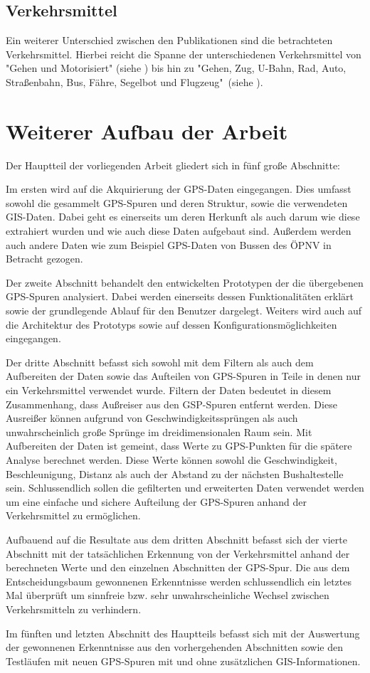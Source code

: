 \subsection{Verkehrsmittel}
Ein weiterer Unterschied zwischen den Publikationen sind die betrachteten Verkehrsmittel. Hierbei reicht die Spanne der unterschiedenen Verkehrsmittel von "Gehen und Motorisiert" (siehe \cite{reddy_using_2010}) bis hin zu "Gehen, Zug, U-Bahn, Rad, Auto, Straßenbahn, Bus, Fähre, Segelbot und Flugzeug"\ (siehe \cite{biljecki_transportation_2013}).

\section{Weiterer Aufbau der Arbeit}
Der Hauptteil der vorliegenden Arbeit gliedert sich in fünf große Abschnitte:

Im ersten wird auf die Akquirierung der GPS-Daten eingegangen. Dies umfasst sowohl die gesammelt GPS-Spuren und deren Struktur, sowie die verwendeten GIS-Daten. Dabei geht es einerseits um deren Herkunft als auch darum wie diese extrahiert wurden und wie auch diese Daten aufgebaut sind. Außerdem werden auch andere Daten wie zum Beispiel GPS-Daten von Bussen des ÖPNV in Betracht gezogen.

Der zweite Abschnitt behandelt den entwickelten Prototypen der die übergebenen GPS-Spuren analysiert. Dabei werden einerseits dessen Funktionalitäten erklärt sowie der grundlegende Ablauf für den Benutzer dargelegt. Weiters wird auch auf die Architektur des Prototyps sowie auf dessen Konfigurationsmöglichkeiten eingegangen.

Der dritte Abschnitt befasst sich sowohl mit dem Filtern als auch dem Aufbereiten der Daten sowie das Aufteilen von GPS-Spuren in Teile in denen nur ein Verkehrsmittel verwendet wurde. Filtern der Daten bedeutet in diesem Zusammenhang, dass Außreiser aus den GSP-Spuren entfernt werden. Diese Ausreißer können aufgrund von Geschwindigkeitssprüngen als auch unwahrscheinlich große Sprünge im dreidimensionalen Raum sein. Mit Aufbereiten der Daten ist gemeint, dass Werte zu GPS-Punkten für die spätere Analyse berechnet werden. Diese Werte können sowohl die Geschwindigkeit, Beschleunigung, Distanz als auch der Abstand zu der nächsten Bushaltestelle sein. Schlussendlich sollen die gefilterten und erweiterten Daten verwendet werden um eine einfache und sichere Aufteilung der GPS-Spuren anhand der Verkehrsmittel zu ermöglichen.

Aufbauend auf die Resultate aus dem dritten Abschnitt befasst sich der vierte Abschnitt mit der tatsächlichen Erkennung von der Verkehrsmittel anhand der berechneten Werte und den einzelnen Abschnitten der GPS-Spur. Die aus dem Entscheidungsbaum gewonnenen Erkenntnisse werden schlussendlich ein letztes Mal überprüft um sinnfreie bzw. sehr unwahrscheinliche Wechsel zwischen Verkehrsmitteln zu verhindern.

Im fünften und letzten Abschnitt des Hauptteils befasst sich mit der Auswertung der gewonnenen Erkenntnisse aus den vorhergehenden Abschnitten sowie den Testläufen mit neuen GPS-Spuren mit und ohne zusätzlichen GIS-Informationen.
